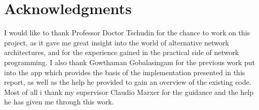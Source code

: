 \chapter{Acknowledgments}
I would like to thank Professor Doctor Tschudin for the chance to work on this project, as it gave me great insight into the world of alternative network architectures, and for the experience gained in the practical side of network programming. I also thank Gowthaman Gobalasingam for the previous work put into the app which provides the basis of the implementation presented in this report, as well as the help he provided to gain an overview of the existing code. Most of all i thank my supervisor Claudio Marxer for the guidance and the help he has given me through this work.  